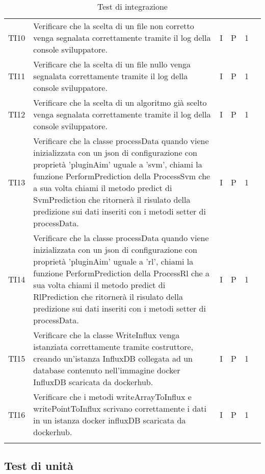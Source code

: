 \begin{longtable} {
		>{}p{12mm}
		>{}p{79.5mm}
		>{}p{9mm}
		>{}p{8mm}
		>{}p{14mm}
		>{}p{0mm}}
	TI10      &  Verificare che la scelta di un file non corretto venga segnalata correttamente tramite il log della console sviluppatore.& I & P  & 1 & \TBstrut \\ [2mm]
	TI11      &  Verificare che la scelta di un file nullo venga segnalata correttamente tramite il log della console sviluppatore.& I & P  & 1 & \TBstrut \\ [2mm]
	TI12      &  Verificare che la scelta di un algoritmo già scelto venga segnalata correttamente tramite il log della console sviluppatore.& I & P  & 1 & \TBstrut \\ [2mm]

	TI13		& Verificare che la classe processData quando viene inizializzata con un json di configurazione con proprietà 'pluginAim' uguale a 'svm', chiami la funzione PerformPrediction della ProcessSvm che a sua volta chiami il metodo predict di SvmPrediction che ritornerà il risulato della predizione sui dati inseriti con i metodi setter di processData.& I & P & 1 & \TBstrut \\ [2mm]
	TI14		& Verificare che la classe processData quando viene inizializzata con un json di configurazione con proprietà 'pluginAim' uguale a 'rl', chiami la funzione PerformPrediction della ProcessRl che a sua volta chiami il metodo predict di RlPrediction che ritornerà il risulato della predizione sui dati inseriti con i metodi setter di processData.& I & P & 1 & \TBstrut \\ [2mm]
	TI15		& Verificare che la classe WriteInflux venga istanziata correttamente tramite costruttore, creando un'istanza InfluxDB collegata ad un database contenuto nell'immagine docker InfluxDB scaricata da dockerhub.& I & P & 1 & \TBstrut \\ [2mm]
	TI16	& Verificare che i metodi writeArrayToInflux e writePointToInflux scrivano correttamente i dati in un istanza docker influxDB scaricata da dockerhub.& I & P & 1 & \TBstrut \\ [2mm]

	\rowcolor{white}
	\caption{Test di integrazione}
\end{longtable}



\subsection{Test di unità}

